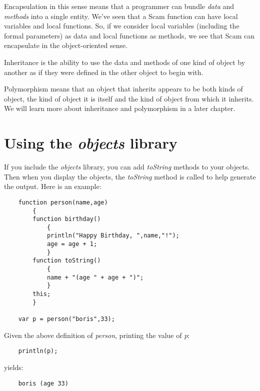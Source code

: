 Encapsulation in this sense means that a programmer
can bundle {\it data} and {\it methods} into a single entity.
We've seen that a Scam function can
have local variables and local functions.
So, if we consider local variables (including the formal
parameters) as data and local
functions as methods, we see that Scam can encapsulate
in the object-oriented sense.

Inheritance is the ability to use the data and methods
of one kind of object by another as if they were defined
in the other object to begin with.

Polymorphism means that an object that inherits appears
to be both kinds of object, the kind of object it is
itself and the kind of object from which it inherits.
We will learn more about inheritance and
polymorphism in a later chapter.

\section{Using the {\it objects} library}

If you include the {\it objects} library,
you can add {\it toString} methods to your objects.
Then when you display the objects, the {\it toString}
method is called to help generate the output.
Here is an example:

\color{CodeGreen}
\begin{codesize}
\begin{verbatim}
    function person(name,age)
        {
        function birthday()
            {
            println("Happy Birthday, ",name,"!");
            age = age + 1;
            }
        function toString()
            {
            name + "(age " + age + ")";
            }
        this;
        }

    var p = person("boris",33);
\end{verbatim}
\end{codesize}
\color{black}

Given the above definition of {\it person}, printing the value of {\it p}:

\color{CodeGreen}
\begin{codesize}
\begin{verbatim}
    println(p);
\end{verbatim}
\end{codesize}
\color{black}

yields:

\color{CodeGreen}
\begin{codesize}
\begin{verbatim}
    boris (age 33)
\end{verbatim}
\end{codesize}
\color{black}
